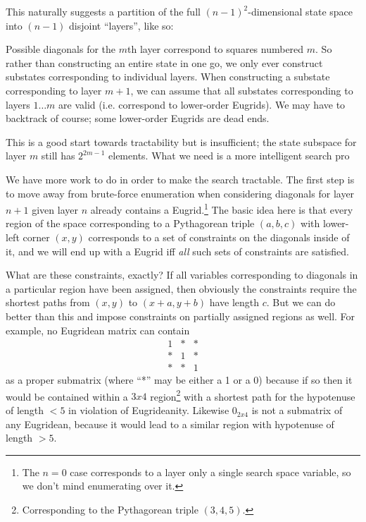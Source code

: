 \documentclass[letterpaper]{article}
\begin{document}
This naturally suggests a partition of the full $(n-1)^2$-dimensional state space into
$(n-1)$ disjoint ``layers'', like so:

\begin{center}
  
\end{center}

Possible diagonals for the $m$th layer correspond to squares numbered $m$. So rather than
constructing an entire state in one go, we only ever construct substates corresponding to
individual layers. When constructing a substate corresponding to layer $m+1$, we can assume
that all substates corresponding to layers $1 \ldots m$ are valid (i.e. correspond to
lower-order Eugrids). We may have to backtrack of course; some lower-order Eugrids are dead
ends.

This is a good start towards tractability but is insufficient; the state subspace for layer
$m$ still has $2^{2m-1}$ elements. What we need is a more intelligent search pro

We have more work to do in order to make the search tractable. The first step is to move away
from brute-force enumeration when considering diagonals for layer $n+1$ given layer $n$
already contains a Eugrid.\footnote{The $n=0$ case corresponds to a layer only a single
search space variable, so we don't mind enumerating over it.} The basic idea here is that
every region of the space corresponding to a Pythagorean triple $(a, b, c)$ with lower-left
corner $(x, y)$ corresponds to a set of constraints on the diagonals inside of it, and we
will end up with a Eugrid iff \emph{all} such sets of constraints are satisfied.

What are these constraints, exactly? If all variables corresponding to diagonals in a
particular region have been assigned, then obviously the constraints require the shortest
paths from $(x, y)$ to $(x+a, y+b)$ have length $c$. But we can do better than this and
impose constraints on partially assigned regions as well. For example, no Eugridean matrix
can contain
\begin{equation*}
\begin{matrix}
  1 & * & * \\
  * & 1 & * \\
  * & * & 1
\end{matrix}
\end{equation*}
as a proper submatrix (where ``*'' may be either a 1 or a 0) because if so then it would be
contained within a $3x4$ region\footnote{Corresponding to the Pythagorean triple $(3, 4,
5)$.} with a shortest path for the hypotenuse of length $< 5$ in violation of Eugrideanity.
Likewise $0_{2 x 4}$ is not a submatrix of any Eugridean, because it would lead to a similar
region with hypotenuse of length $> 5$.
\end{document}

